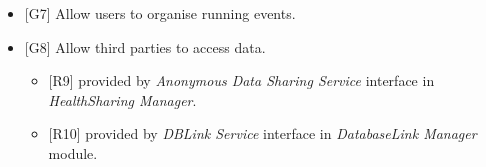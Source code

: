 \documentclass[DD.tex]{subfiles}
\begin{document}
\begin{itemize}
	\item {[G7]} Allow users to organise running events.
	
	\item {[G8]} Allow third parties to access data.
	\begin{itemize}
		\item {[R9]} provided by \textit{Anonymous Data Sharing Service} interface in \textit{HealthSharing Manager}.
		\item {[R10]} provided by \textit{DBLink Service} interface in \textit{DatabaseLink Manager} module.
	\end{itemize}
	
\end{itemize}
\newpage
\end{document}
